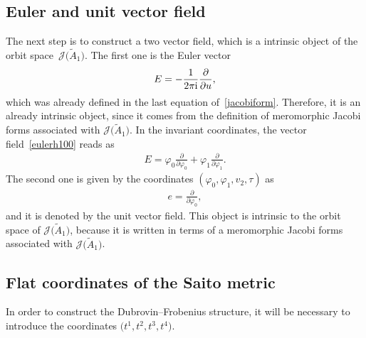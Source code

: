 \documentclass[10pt,a4paper]{amsart}
\numberwithin{equation}{section}
\newcommand{\Ja}{\mathcal{J}}
\begin{document}
\subsection{Euler and unit vector field}

The next step is to construct a two vector field, which is a intrinsic object of the orbit spa\-ce~$\Ja\big(\tilde A_1\big)$. The first one is the Euler vector
\begin{gather}\label{eulerh100}
E=-\frac{1}{2\pi {\rm i}}\frac{\partial}{\partial u},
\end{gather}
which was already defined in the last equation of~\eqref{jacobiform}. Therefore, it is an already intrinsic object, since it comes from the definition of meromorphic Jacobi forms associated with $\Ja\big(\tilde A_1\big)$. In the invariant coordinates, the vector field~\eqref{eulerh100} reads as
\begin{gather*}
E=\varphi_0\frac{\partial}{\partial \varphi_0}+\varphi_1\frac{\partial}{\partial \varphi_1}.
\end{gather*}
The second one is given by the coordinates $(\varphi_0,\varphi_1,v_2,\tau)$ as
\begin{gather}\label{unith100}
e=\frac{\partial}{\partial \varphi_0},
\end{gather}
and it is denoted by the unit vector field. This object is intrinsic to the orbit space of $\Ja\big(\tilde A_1\big)$, because it is written in terms of a meromorphic Jacobi forms associated with $\Ja\big(\tilde A_1\big)$.

\subsection{Flat coordinates of the Saito metric}

In order to construct the Dubrovin--Frobenius structure, it will be necessary to introduce the coordinates $\big(t^1,t^2,t^3,t^4\big)$.
\end{document}
